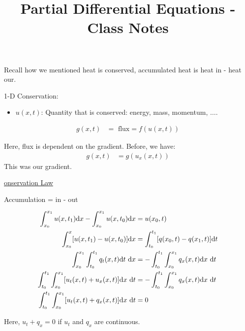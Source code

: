 \documentclass{article}
\title{Partial Differential Equations - Class Notes} %
\begin{document}
\maketitle
\newpage


Recall how we mentioned heat is conserved, accumulated heat is heat in - heat our.

1-D Conservation:
\begin{itemize}
  \item $u(x, t)$: Quantity that is conserved: energy, mass, momentum, $\ldots$.
\end{itemize}
  \begin{align}
    g(x, t) & = \text{ flux} = f(u(x, t))
  \end{align}

  Here, flux is dependent on the gradient. Before, we have:
  \begin{align}
    g(x, t) & = g(u_x(x, t))
  \end{align}
  This was our gradient.

  \underline{onservation Law}

  \begin{center}
    Accumulation = in - out
  \end{center}
  \begin{align}
    \int^{x_1}_{x_0} u(x, t_1) \text dx - \int^{x_1}_{x_0} u(x, t_0) \text dx
    & = u(x_0, t)\\
    \int^x_{x_0} [u(x, t_1) - u(x, t_0)] \text dx
    & = \int^{t_1}_{t_0} [ q(x_0, t) - q(x_1, t)] \text dt\\
    \int^{x_1}_{x_0} \int^{t_1}_{t_0} q_t(x, t) \text dt\ \text dx
    & = - \int^{t_1}_{t_0} \int^{x_1}_{x_0} q_x(x, t) \text dx\ \text dt\\
    \int^{t_1}_{t_0} \int^{x_1}_{x_0} [u_t(x, t) + u_x(x, t)] \text dx\ \text dt
    & = -\int^{t_1}_{t_0} \int^{x_1}_{x_0} q_x(x, t) \text dx\ \text dt\\
    \int^{t_1}_{t_0} \int^{x_1}_{x_0} [u_t(x, t) + q_x(x, t)] \text dx\ \text dt & = 0
  \end{align}

  Here, $u_t + q_x = 0$ if $u_t$ and $q_x$ are continuous.
\end{document}

